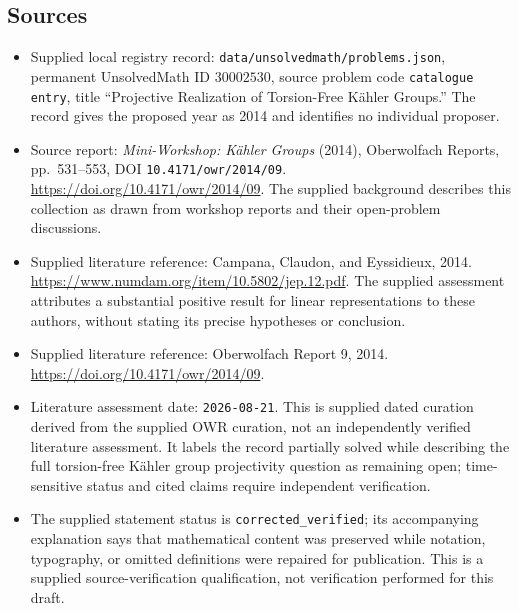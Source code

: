 \documentclass[11pt]{article}
\begin{document}
\subsection{Sources}
\begin{itemize}
\item Supplied local registry record: \texttt{data/unsolvedmath/problems.json}, permanent UnsolvedMath ID \(30002530\), source problem code \texttt{catalogue entry}, title ``Projective Realization of Torsion-Free K\"ahler Groups.'' The record gives the proposed year as 2014 and identifies no individual proposer.
\item Source report: \emph{Mini-Workshop: K\"ahler Groups} (2014), Oberwolfach Reports, pp.\ 531--553, DOI \texttt{10.4171/owr/2014/09}. \url{https://doi.org/10.4171/owr/2014/09}. The supplied background describes this collection as drawn from workshop reports and their open-problem discussions.
\item Supplied literature reference: Campana, Claudon, and Eyssidieux, 2014. \url{https://www.numdam.org/item/10.5802/jep.12.pdf}. The supplied assessment attributes a substantial positive result for linear representations to these authors, without stating its precise hypotheses or conclusion.
\item Supplied literature reference: Oberwolfach Report 9, 2014. \url{https://doi.org/10.4171/owr/2014/09}.
\item Literature assessment date: \texttt{2026-08-21}. This is supplied dated curation derived from the supplied OWR curation, not an independently verified literature assessment. It labels the record partially solved while describing the full torsion-free K\"ahler group projectivity question as remaining open; time-sensitive status and cited claims require independent verification.
\item The supplied statement status is \texttt{corrected\_verified}; its accompanying explanation says that mathematical content was preserved while notation, typography, or omitted definitions were repaired for publication. This is a supplied source-verification qualification, not verification performed for this draft.
\end{itemize}
\end{document}
